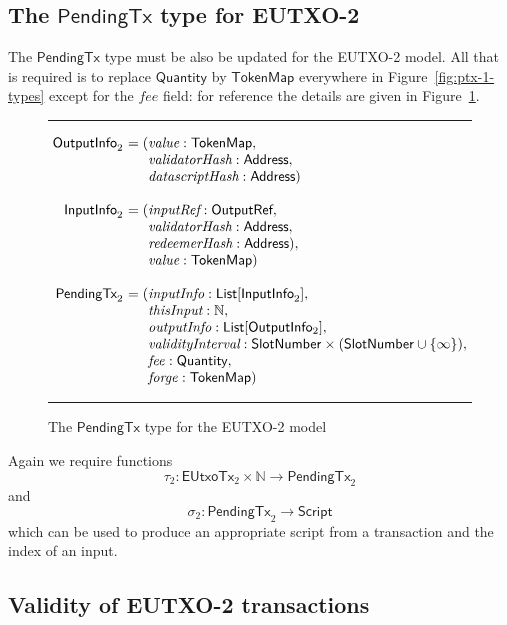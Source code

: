 \documentclass[a4paper]{article}
\renewcommand{\i}{\textit}  %
\newcommand{\s}{\textsf}  %
\newenvironment{arraydefs}[1]{\setlength{\arraycolsep}{0pt}\begin{array}{#1}}{\end{array}}
\newcommand\rfskip{7pt}
\newenvironment{ruledfigure}[1]{\begin{figure}[#1]\hrule\vspace{\rfskip}}{\vspace{\rfskip}\hrule\end{figure}}
\newcommand{\List}[1]{\ensuremath{\s{List}[#1]}}
\newcommand{\script}{\ensuremath{\s{Script}}}
\newcommand{\ptx}{\ensuremath{\s{PendingTx}}}
\newcommand{\mi}[1]{\ensuremath{\mathit{#1}}}
\newcommand{\forge}{\mi{forge}}
\newcommand{\fee}{\mi{fee}}
\newcommand{\msf}[1]{\ensuremath{\mathsf{#1}}}
\newcommand{\slotnum}{\msf{SlotNumber}}
\newcommand{\eutxotx}{\msf{EUtxoTx}}
\newcommand{\qty}{\ensuremath{\s{Quantity}}}
\newcommand{\tokenmap}{\ensuremath{\s{TokenMap}}}
\newcommand\N{\ensuremath{\mathbb{N}}}
\begin{document}
\subsection{The $\ptx$ type for EUTXO-2}
\label{sec:pendingtx-2}
The $\ptx$ type must be also be updated for the EUTXO-2 model.  All
that is required is to replace $\qty$ by $\tokenmap$ everywhere in
Figure~\ref{fig:ptx-1-types} except for the $\fee$ field: for reference
the details are given in Figure~\ref{fig:ptx-2-types}.
\begin{ruledfigure}{H}
  \[
  \begin{arraydefs}{rll}
    
    \s{OutputInfo}_2\s{ } &= (& \i{value}: \tokenmap,\\
    && \i{validatorHash}: \s{Address},\\
    &&  \i{datascriptHash}: \s{Address})\\
    \\
    \s{InputInfo}_2\s{ }& = (&\i{inputRef}: \s{OutputRef},\\
                 && \i{validatorHash}: \s{Address},\\
                 && \i{redeemerHash}: \s{Address}),\\
                 && \i{value}: \tokenmap)\\
     \\
     \ptx_2\s{ } &= (&\i{inputInfo}: \List{\s{InputInfo}_2},\\
     &&\i{thisInput}: \N,\\
     &&\i{outputInfo}: \List{\s{OutputInfo$_2$}},\\
     &&\i{validityInterval}: \slotnum \times (\slotnum \cup \{\infty\}),\\
     &&\fee: \qty,\\
     &&\forge: \tokenmap)
   \end{arraydefs}
 \]
  \caption{The $\ptx$ type for the EUTXO-2 model}
  \label{fig:ptx-2-types}
\end{ruledfigure}

\noindent Again we require functions
$$
\tau_2: \eutxotx_2 \times \N \rightarrow \ptx_2
$$
and
$$
\sigma_2: \ptx_2 \rightarrow \script
$$
which can be used to produce an appropriate script from a transaction
and the index of an input.

\subsection{Validity of EUTXO-2 transactions}
\label{sec:eutxo-2-validity}
\end{document}
